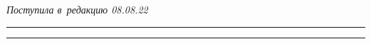 










\vspace*{-8pt}





\hfill{\small\textit{Поступила в~редакцию 08.08.22}}





\vspace*{6pt}





\hrule





\vspace*{2pt}















\hrule





\vspace*{6pt}





\def\tit{DATABASE OF~HIERARCHIES OF~LOGICAL-SEMANTIC RELATIONS: USER 


INTERFACE}











\def\titkol{Database of~hierarchies of~logical-semantic relations: User 


interface}





\def\aut{A.\,A.~Durnovo$^1$, O.\,Yu.~Inkova$^{1,2}$, and N.\,A.~Popkova$^1$}





\def\autkol{A.\,A.~Durnovo, O.\,Yu.~Inkova, and N.\,A.~Popkova}





